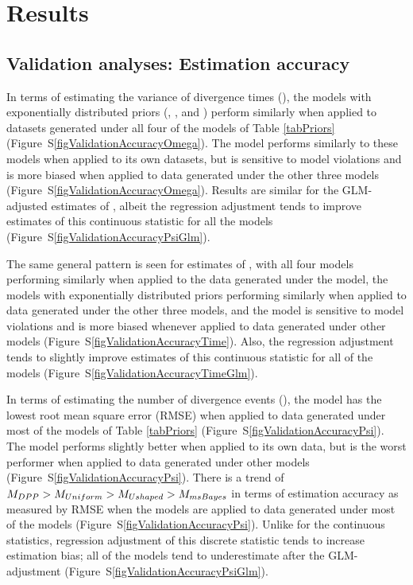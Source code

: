 \section{Results}
\subsection{Validation analyses: Estimation accuracy}
In terms of estimating the variance of divergence times (\divTimeDispersion),
the models with exponentially distributed priors (\modelUshaped, \modelUniform,
and \modelDPP) perform similarly when applied to datasets generated under all
four of the models of Table \ref{tabPriors}
(Figure~S\ref{figValidationAccuracyOmega}).
The \modelOld model performs similarly to these models when applied to its
own datasets, but is sensitive to model violations and is more biased when
applied to data generated under the other three models
(Figure~S\ref{figValidationAccuracyOmega}).
Results are similar for the GLM-adjusted estimates of \divTimeDispersion,
albeit the regression adjustment tends to improve estimates of this continuous
statistic for all the models
(Figure~S\ref{figValidationAccuracyPsiGlm}).

The same general pattern is seen for estimates of \divTimeMean, with all four
models performing similarly when applied to the data generated under the
\modelOld model, the models with exponentially distributed priors performing
similarly when applied to data generated under the other three models, and the
\modelOld model is sensitive to model violations and is more biased whenever
applied to data generated under other models
(Figure~S\ref{figValidationAccuracyTime}).
Also, the regression adjustment tends to slightly improve estimates of
this continuous statistic for all of the models
(Figure~S\ref{figValidationAccuracyTimeGlm}).

In terms of estimating the number of divergence events (\divTimeNum), the
\modelDPP model has the lowest root mean square error (RMSE) when applied
to data generated under most of the models of Table \ref{tabPriors}
(Figure~S\ref{figValidationAccuracyPsi}).
The \modelOld model performs slightly better when applied to its own data,
but is the worst performer when applied to data generated under other models
(Figure~S\ref{figValidationAccuracyPsi}).
There is a trend of $M_{DPP} > M_{Uniform} > M_{Ushaped} > M_{msBayes}$
in terms of estimation accuracy as measured by RMSE when the models are applied
to data generated under most of the models
(Figure~S\ref{figValidationAccuracyPsi}).
Unlike for the continuous statistics, regression adjustment of this discrete
statistic tends to increase estimation bias; all of the models tend to
underestimate \divTimeDispersion after the GLM-adjustment
(Figure~S\ref{figValidationAccuracyPsiGlm}).

